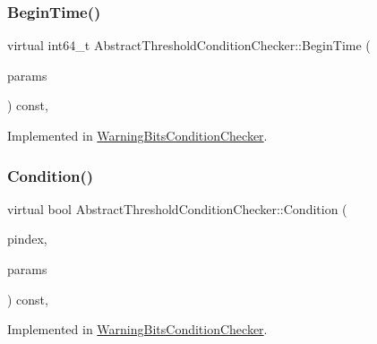 \subsubsection{\texorpdfstring{Begin\+Time()}{BeginTime()}}
{\footnotesize\ttfamily virtual int64\+\_\+t Abstract\+Threshold\+Condition\+Checker\+::\+Begin\+Time (\begin{DoxyParamCaption}\item[{const \mbox{\hyperlink{chainparams_8h_a5e1ca1b35c3dd1a4e20f18445f28dd9c}{Consensus\+::\+Params}} \&}]{params }\end{DoxyParamCaption}) const\hspace{0.3cm}{\ttfamily [protected]}, {}}



Implemented in \mbox{\hyperlink{class_warning_bits_condition_checker_ab0aff380fa3d04ad540ce178792dad53}{Warning\+Bits\+Condition\+Checker}}.

\mbox{\label{class_abstract_threshold_condition_checker_a242388d3046f69956904f0ea7a1e92ee}} 
\subsubsection{\texorpdfstring{Condition()}{Condition()}}
{\footnotesize\ttfamily virtual bool Abstract\+Threshold\+Condition\+Checker\+::\+Condition (\begin{DoxyParamCaption}\item[{const \mbox{\hyperlink{class_c_block_index}{C\+Block\+Index}} $\ast$}]{pindex,  }\item[{const \mbox{\hyperlink{chainparams_8h_a5e1ca1b35c3dd1a4e20f18445f28dd9c}{Consensus\+::\+Params}} \&}]{params }\end{DoxyParamCaption}) const\hspace{0.3cm}{\ttfamily [protected]}, {}}



Implemented in \mbox{\hyperlink{class_warning_bits_condition_checker_aae2fc419d193b147e8fad8121fb5e579}{Warning\+Bits\+Condition\+Checker}}.

\mbox{\label{class_abstract_threshold_condition_checker_a798df83d41a24e8ca12c02fb25d07c1c}} 
